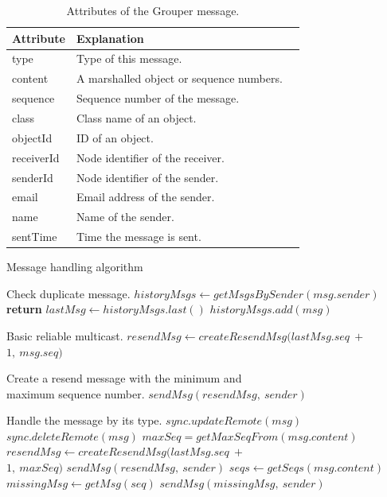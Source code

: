 \documentclass[sigconf]{acmart}
\begin{document}
\begin{table}[t]
	\centering
	\small
	\caption{Attributes of the Grouper message.}
	\begin{tabular}{lll}
		\hline
		\textbf{Attribute} & \textbf{Explanation} \\ \hline
		type & Type of this message. \\
		content & A marshalled object or sequence numbers. \\
		sequence & Sequence number of the message. \\
		class & Class name of an object. \\
		objectId & ID of an object. \\
		receiverId & Node identifier of the receiver. \\
		senderId & Node identifier of the sender. \\
		email & Email address of the sender. \\
		name & Name of the sender. \\
		sentTime & Time the message is sent. \\
		\hline
	\end{tabular}
\end{table}

\begin{algorithm}[t]
	\caption{Message handling algorithm}\label{alg:euclid}
	\begin{algorithmic}[1]		
		\LeftComment Check duplicate message.
		\State  $historyMsgs \gets getMsgsBySender(msg.sender)$
		\State \textbf{return}
		\EndIf
		\State $lastMsg \gets historyMsgs.last()$
		\State $historyMsgs.add(msg)$
		
		\LeftComment Basic reliable multicast.
		\State $resendMsg \gets createResendMsg(lastMsg.seq\ +\ $ \\\hspace{2.7cm} $1,\ msg.seq)$
		
		\Comment Create a resend message with the minimum and \\\hspace{1.7cm} maximum sequence number.
		\State $sendMsg(resendMsg,\ sender)$
		\EndIf
		
		\LeftComment Handle the message by its type.
		\State $sync.updateRemote(msg)$
		\State $sync.deleteRemote(msg)$
		\State $maxSeq = getMaxSeqFrom(msg.content)$
		\State $resendMsg \gets createResendMsg(lastMsg.seq\ +\ $ \\\hspace{2.7cm}  $1,\ maxSeq)$
		\State $sendMsg(resendMsg,\ sender)$
		\EndIf
		\State $seqs \gets getSeqs(msg.content)$
		\State $missingMsg \gets getMsg(seq)$
		\State $sendMsg(missingMsg,\ sender)$
		\EndFor
		\EndIf
		\EndProcedure
	\end{algorithmic}
\end{algorithm}
\end{document}
